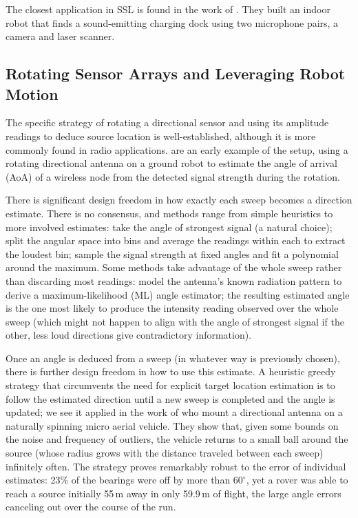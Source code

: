 The closest application in SSL is found in the work of
\citet{luo2010docking}. They built an indoor robot that finds a sound-emitting charging dock using two microphone pairs, a camera and laser scanner.

\subsection{Rotating Sensor Arrays and Leveraging Robot Motion}

The specific strategy of rotating a directional sensor and using its amplitude readings to deduce source location is well-established, although it is more commonly found in radio applications. \citet{graefenstein2009wireless} are an early example of the setup, using a rotating directional antenna on a ground robot to estimate the angle of arrival (AoA) of a wireless node from the detected signal strength during the rotation.

There is significant design freedom in how exactly each sweep becomes a direction estimate. There is no consensus, and methods range from simple heuristics to more involved estimates: \citet{graefenstein2009wireless}
take the angle of strongest signal (a natural choice); \citet{venkateswaran2013rf} split the angular space into bins and average the readings within each to extract the loudest bin; \citet{tokekar2011active} sample the signal strength at
fixed angles and fit a polynomial around the maximum. Some methods take advantage of the whole sweep rather than discarding most readings: \citet{singleantenna2025} model the antenna's known radiation pattern to derive a maximum-likelihood (ML) angle estimator; the resulting estimated angle is the one most likely to produce the intensity reading observed over the whole sweep (which might not happen to align with the angle of strongest signal if the other, less loud directions give contradictory information).

Once an angle is deduced from a sweep (in whatever way is previously chosen), there is further design freedom in how to use this estimate. A heuristic greedy strategy that circumvents the need for explicit target location estimation is to follow the estimated direction until a new sweep is completed and the angle is updated; we see it applied in the work of \citet{venkateswaran2013rf} who mount a directional
antenna on a naturally spinning micro aerial vehicle. They show that, given some bounds on the noise and frequency of outliers, the vehicle returns to a small ball around the source (whose radius grows with the distance traveled between each sweep) infinitely often. The strategy proves remarkably robust to the error of individual estimates: 23\% of
the bearings were off by more than $60^\circ$, yet a rover was able to reach a source initially 55\,m away in only 59.9\,m of flight, the large angle errors canceling out over the course of the run. 

